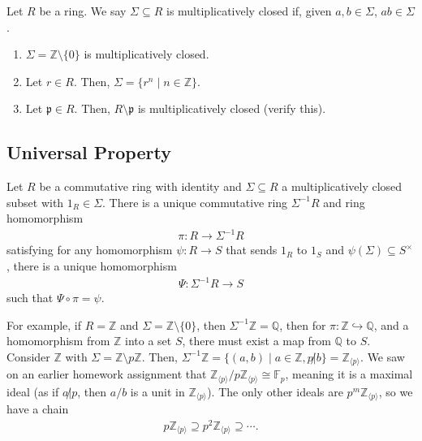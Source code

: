 \documentclass[10pt]{extarticle}
\newcommand{\Q}{\mathbb{Q}}
\newcommand{\Z}{\mathbb{Z}}
\begin{document}
  Let $R$ be a ring. We say $\Sigma \subseteq R$ is multiplicatively closed if, given $a,b\in \Sigma$, $ab \in \Sigma$.
  \begin{enumerate}[(1)]
    \item $\Sigma = \Z\setminus\{0\}$ is multiplicatively closed.
    \item Let $r\in R$. Then, $\Sigma = \{r^n\mid n\in\Z\}$.
    \item Let $\mathfrak{p}\in R$. Then, $R\setminus \mathfrak{p}$ is multiplicatively closed (verify this).
  \end{enumerate}
  \subsection{Universal Property}%
  Let $R$ be a commutative ring with identity and $\Sigma\subseteq R$ a multiplicatively closed subset with $1_R\in \Sigma$. There is a unique commutative ring $\Sigma^{-1}R$ and ring homomorphism
  \begin{align*}
   \pi: R\rightarrow \Sigma^{-1}R
  \end{align*}
  satisfying for any homomorphism $\psi: R\rightarrow S$ that sends $1_R$ to $1_S$ and $\psi(\Sigma) \subseteq S^{\times}$, there is a unique homomorphism
  \begin{align*}
   \Psi: \Sigma^{-1}R \rightarrow S
  \end{align*}
  such that $\Psi \circ \pi = \psi$.
  \begin{center}
  \end{center}
  For example, if $R = \Z$ and $\Sigma = \Z\setminus\{0\}$, then $\Sigma^{-1}\Z = \Q$, then for $\pi: \Z\hookrightarrow \Q$, and a homomorphism from $\Z$ into a set $S$, there must exist a map from $\Q$ to $S$.\\

  Consider $\Z$ with $\Sigma = \Z\setminus p\Z$. Then, $\Sigma^{-1}\Z = \{(a,b)\mid a\in\Z, p\not|b\} = \Z_{\langle p \rangle}$. We saw on an earlier homework assignment that $\Z_{\langle p \rangle}/p\Z_{\langle p \rangle} \cong \mathbb{F}_p$, meaning it is a maximal ideal (as if $a\not| p$, then $a/b$ is a unit in $\Z_{\langle p \rangle}$). The only other ideals are $p^m \Z_{\langle p \rangle}$, so we have a chain
  \begin{align*}
    p\Z_{\langle p \rangle} \supseteq p^2\Z_{\langle p \rangle} \supseteq \cdots.
  \end{align*}
\end{document}
